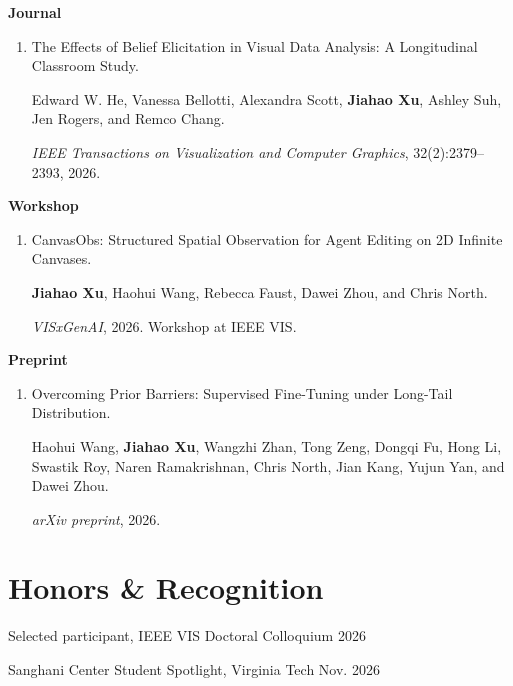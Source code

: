 \documentclass[11pt,letterpaper]{article}
\begin{document}
{\small\bfseries Journal\par}
\begin{enumerate}[resume]
  \item The Effects of Belief
    Elicitation in Visual Data Analysis: A Longitudinal Classroom Study.\par
    {\small Edward W. He, Vanessa Bellotti, Alexandra Scott, \textbf{Jiahao Xu},
    Ashley Suh, Jen Rogers, and Remco Chang.\par}
    {\small \textit{IEEE Transactions on Visualization and Computer Graphics},
    32(2):2379--2393, 2026.\par}
\end{enumerate}

{\small\bfseries Workshop\par}
\begin{enumerate}[resume]
  \item CanvasObs: Structured Spatial
    Observation for Agent Editing on 2D Infinite Canvases.\par
    {\small \textbf{Jiahao Xu}, Haohui Wang, Rebecca Faust, Dawei Zhou,
    and Chris North.\par}
    {\small \textit{VISxGenAI}, 2026. Workshop at IEEE VIS.\par}
\end{enumerate}

{\small\bfseries Preprint\par}
\begin{enumerate}[resume]
  \item Overcoming Prior Barriers:
    Supervised Fine-Tuning under Long-Tail Distribution.\par
    {\small Haohui Wang, \textbf{Jiahao Xu}, Wangzhi Zhan, Tong Zeng, Dongqi Fu,
    Hong Li, Swastik Roy, Naren Ramakrishnan, Chris North, Jian Kang,
    Yujun Yan, and Dawei Zhou.\par}
    {\small \textit{arXiv preprint}, 2026.\par}
\end{enumerate}

\section*{Honors \& Recognition}
Selected participant, IEEE VIS Doctoral Colloquium \hfill 2026\par
\vspace{3pt}
Sanghani Center Student Spotlight, Virginia Tech \hfill Nov. 2026\par
\end{document}
